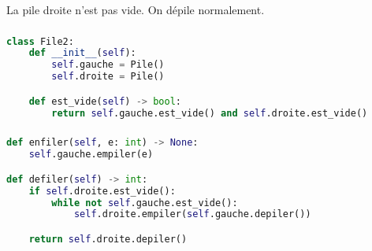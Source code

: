 \documentclass[svgnames,11pt]{beamer}
\begin{document}
\begin{frame}
    \begin{center}
    \end{center}
    \begin{center}
        La pile droite n'est pas vide. On dépile normalement.
    \end{center}
\end{frame}
\begin{frame}[fragile]
    \frametitle{}

    \begin{lstlisting}[language=Python , basicstyle=\ttfamily\small, xleftmargin=.5em, xrightmargin=0em]
class File2:
    def __init__(self):
        self.gauche = Pile()
        self.droite = Pile()

    def est_vide(self) -> bool:
        return self.gauche.est_vide() and self.droite.est_vide()        
\end{lstlisting}

\end{frame}
\begin{frame}[fragile]
    \frametitle{}

    \begin{lstlisting}[language=Python , basicstyle=\ttfamily\small, xleftmargin=.5em, xrightmargin=-1em]
def enfiler(self, e: int) -> None:
    self.gauche.empiler(e)

def defiler(self) -> int:
    if self.droite.est_vide():
        while not self.gauche.est_vide():
            self.droite.empiler(self.gauche.depiler())

    return self.droite.depiler()       
\end{lstlisting}

\end{frame}
\end{document}
